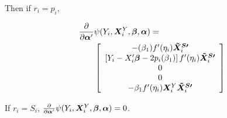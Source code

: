 \documentclass{statsoc} %
\begin{document}
Then if $r_i=p_i$,

\begin{align*}
  \frac{\partial}{\partial \bm{\alpha}'}&\psi(Y_i,\bm{X}^Y_i,\bm{\beta},\bm{\alpha})=\\
  & \left[\begin{array}{c}
          -(\beta_1)f'(\eta_i)\bm{\tilde{X}^{S\prime}}_i\\
          \left[Y_i-X_i'\bm{\beta}-2p_i(\beta_1)\right]f'(\eta_i)\bm{\tilde{X}^{S\prime}}_i\\
          0\\
          0\\
          -\beta_1f'(\eta_i)\bm{X}^Y_i\bm{\tilde{X}^{S\prime}}_i
    \end{array}\right]
\end{align*}

If $r_i=S_i$, $\frac{\partial}{\partial \bm{\alpha}'}\psi(Y_i,\bm{X}^Y_i,\bm{\beta},\bm{\alpha})=0$.
\end{document}
